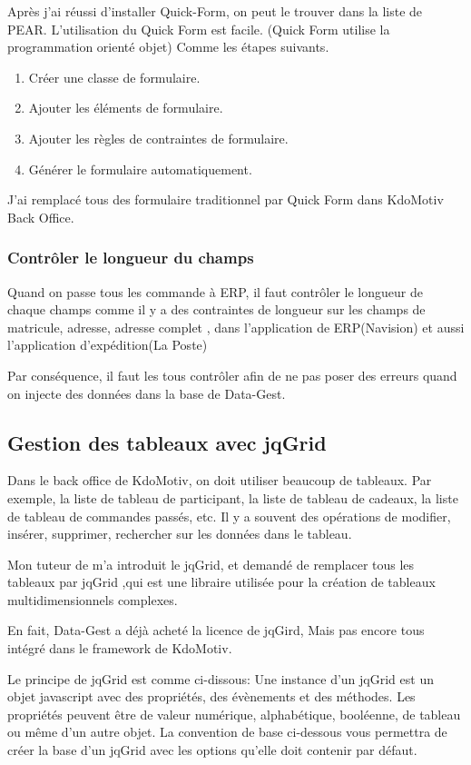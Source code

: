 Après j'ai réussi d'installer Quick-Form, on peut le trouver dans la liste de PEAR. L'utilisation du Quick Form est facile. (Quick Form utilise la programmation orienté objet) Comme les étapes suivants.
\begin{enumerate}
\item Créer une classe de formulaire.
\item Ajouter les éléments de formulaire.
\item Ajouter les règles de contraintes de formulaire.
\item Générer le formulaire automatiquement. 
\end{enumerate}

J'ai remplacé tous des formulaire traditionnel par Quick Form dans KdoMotiv Back Office.

\subsubsection{Contrôler le longueur du champs}
Quand on passe tous les commande à ERP, il faut contrôler le longueur de chaque champs comme il y a des contraintes de longueur sur les champs de matricule, adresse, adresse complet , dans l'application de ERP(Navision) et aussi l'application d'expédition(La Poste)

Par conséquence, il faut les tous contrôler afin de ne pas poser des erreurs quand on injecte des données dans la base de Data-Gest.

\subsection{Gestion des tableaux avec jqGrid}
Dans le back office de KdoMotiv, on doit utiliser beaucoup de tableaux. Par exemple, la liste de tableau de participant, la liste de tableau de cadeaux, la liste de tableau de commandes passés, etc. Il y a souvent des opérations de modifier, insérer, supprimer, rechercher sur les données dans le tableau.

Mon tuteur de m'a introduit le jqGrid, et demandé de remplacer tous les tableaux par jqGrid ,qui est une libraire utilisée pour la création de tableaux multidimensionnels complexes.

En fait, Data-Gest a déjà acheté la licence de jqGird,  Mais pas encore tous intégré dans le framework de KdoMotiv. 

Le principe de jqGrid est comme ci-dissous:
Une instance d’un jqGrid est un objet javascript avec des propriétés, des évènements et des méthodes. Les propriétés peuvent être de valeur numérique, alphabétique, booléenne, de  tableau ou même d’un autre objet. La convention de base ci-dessous vous permettra de créer la base d’un jqGrid avec les options qu’elle doit contenir par défaut.

